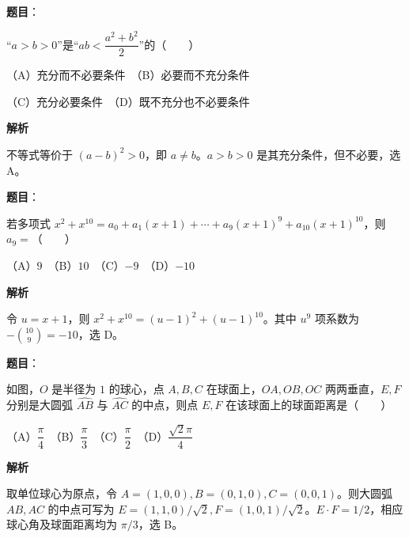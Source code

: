 \begin{answer}

\textbf{题目}：

“$a>b>0$”是“$ab<\dfrac{a^2+b^2}{2}$”的\mbox{（　　）}

（A）充分而不必要条件　（B）必要而不充分条件

（C）充分必要条件　（D）既不充分也不必要条件

\textbf{解析}

不等式等价于 $(a-b)^2>0$，即 $a\ne b$。$a>b>0$ 是其充分条件，但不必要，选 A。


\end{answer}
\begin{answer}

\textbf{题目}：

若多项式 $x^2+x^{10}=a_0+a_1(x+1)+\cdots+a_9(x+1)^9+a_{10}(x+1)^{10}$，则 $a_9=$\mbox{（　　）}

（A）$9$　（B）$10$　（C）$-9$　（D）$-10$

\textbf{解析}

令 $u=x+1$，则 $x^2+x^{10}=(u-1)^2+(u-1)^{10}$。其中 $u^9$ 项系数为 $-\binom{10}{9}=-10$，选 D。


\end{answer}
\begin{answer}

\textbf{题目}：

如图，$O$ 是半径为 $1$ 的球心，点 $A,B,C$ 在球面上，$OA,OB,OC$ 两两垂直，$E,F$ 分别是大圆弧 $\widehat{AB}$ 与 $\widehat{AC}$ 的中点，则点 $E,F$ 在该球面上的球面距离是\mbox{（　　）}

（A）$\dfrac{\pi}{4}$　（B）$\dfrac{\pi}{3}$　（C）$\dfrac{\pi}{2}$　（D）$\dfrac{\sqrt2\pi}{4}$
\nopagebreak[4]
\begin{center}\end{center}
\nopagebreak[4]
\textbf{解析}

取单位球心为原点，令 $A=(1,0,0),B=(0,1,0),C=(0,0,1)$。则大圆弧 $AB,AC$ 的中点可写为 $E=(1,1,0)/\sqrt2,F=(1,0,1)/\sqrt2$。$E\cdot F=1/2$，相应球心角及球面距离均为 $\pi/3$，选 B。


\end{answer}
